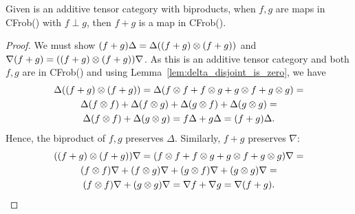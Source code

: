 \begin{lemma}\label{lem:biproduct-is-in-cfrob-x}
  Given \X is an additive tensor category with biproducts, when $f,g$ are maps in CFrob(\X) with
  $f\perp g$, then $f+g$ is a map in CFrob(\X).
\end{lemma}
\begin{proof}
  We must show $(f+g)\Delta = \Delta((f+g)\otimes(f+g))$ and $\nabla(f+g) = ((f+g)\otimes(f+g))\nabla$. As
  this is an additive tensor category and both $f,g$ are in CFrob(\X) and using
  Lemma~\ref{lem:delta_disjoint_is_zero}, we have
  \begin{multline*}
    \Delta((f+g)\otimes(f+g)) = \Delta( f\otimes f + f\otimes g + g\otimes f + g\otimes g) = \\
    \Delta(f\otimes f) + \Delta(f\otimes g) + \Delta(g\otimes f) + \Delta(g\otimes g) = \\
    \Delta(f\otimes f) + \Delta(g\otimes g) = f\Delta + g \Delta = (f+g)\Delta.
  \end{multline*}
  Hence, the biproduct of $f,g$ preserves $\Delta$.
  Similarly, $f+g$ preserves $\nabla$:
  \begin{multline*}
    ((f+g)\otimes(f+g))\nabla =( f\otimes f + f\otimes g + g\otimes f + g\otimes g)\nabla = \\
    (f\otimes f)\nabla +(f\otimes g) \nabla+(g\otimes f)\nabla + (g\otimes g)\nabla = \\
    (f\otimes f)\nabla + (g\otimes g)\nabla =\nabla f + \nabla g  = \nabla(f+g).
  \end{multline*}
\end{proof}

